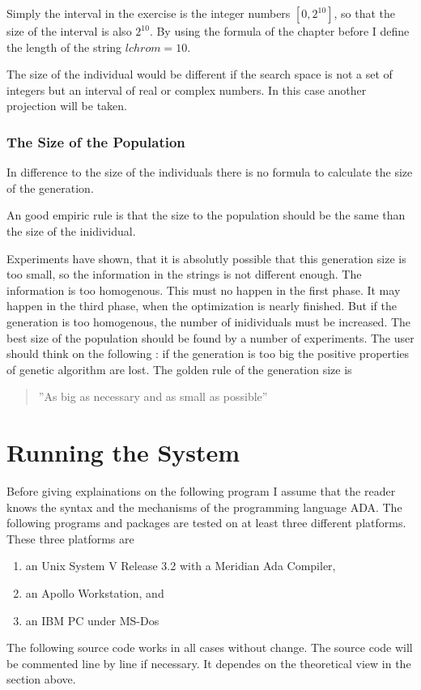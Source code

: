 Simply the interval in the exercise is the integer numbers $[0 , 2^{10}]$, so
that the size of the interval is also $2^{10}$. By using the formula of the chapter
before I define the length of the string $lchrom = 10$.

The size of the individual would be different if the search space is not a set
of integers but an interval of real or complex numbers. In this case another
projection will be taken.
\subsubsection{The Size of the Population}
In difference to the size of the individuals there is no formula to calculate
the size of the generation.

An good empiric rule is that the size to the population should be the same than
the size of the inidividual.

Experiments have shown, that it is absolutly possible that this generation size
is too small, so the information in the strings is not different enough. The
information is too homogenous. This must no happen in the first phase. It may
happen in the third phase, when the optimization is nearly finished. But if the
generation is too homogenous, the number of inidividuals must be increased. The
best size of the population should be found by a number of experiments. The user
should think on the following : if the generation is too big the positive properties
of genetic algorithm are lost. The golden rule of the generation size is
\begin{quotation}
''As big as necessary and as small as possible''
\end{quotation}
\section{Running the System}
Before giving explainations on the following program I assume that the reader
knows the syntax and the mechanisms of the programming language ADA. The following
programs and packages are tested on at least three different platforms. These
three platforms are
\begin{enumerate}
  \item an Unix System V Release 3.2 with a Meridian Ada Compiler,
  \item an Apollo Workstation, and
  \item an IBM PC under MS-Dos
\end{enumerate}
The following source code works in all cases without change. The source code
will be commented line by line if necessary. It dependes on the theoretical
view in the section above.
